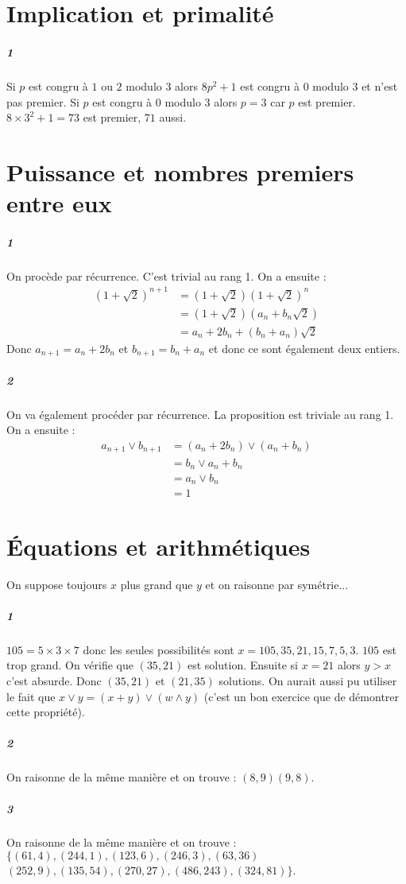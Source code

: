 \documentclass[10pt,a4paper]{article}
\begin{document}
\section{Implication et primalité}
\subparagraph{1}Si $p$ est congru à $1$ ou $2$ modulo 3 alors $8p^2+1$ est congru à $0$ modulo 3 et n'est pas premier. Si $p$ est congru à $0$ modulo 3 alors $p=3$ car $p$ est premier. $8 \times 3^2+1=73$ est premier, $71$ aussi.
\section{Puissance et nombres premiers entre eux}
\subparagraph{1}On procède par récurrence. C'est trivial au rang 1. On a ensuite :
\begin{equation}
\begin{aligned}
(1+ \sqrt{2})^{n+1}&=(1+  \sqrt{2})(1+ \sqrt{2})^n \\
&=(1+ \sqrt{2})(a_n+b_n \sqrt{2}) \\
&=a_n+2 b_n+(b_n+a_n) \sqrt{2}
\end{aligned}
\end{equation}
Donc $a_{n+1}=a_n+2b_n$ et $b_{n+1}=b_n+a_n$ et donc ce sont également deux entiers.
\subparagraph{2} On va également procéder par récurrence. La proposition est triviale au rang 1. On a ensuite :
\begin{equation}
\begin{aligned}
a_{n+1} \vee b_{n+1}&=(a_n +2 b_n) \vee (a_n +b_n)\\
&=b_n \vee a_n+b_n \\
&=a_n \vee b_n \\
&=1
\end{aligned}
\end{equation}
\section{Équations et arithmétiques}
\danger On suppose toujours $x$ plus grand que $y$ et on raisonne par symétrie...
\subparagraph{1} $105 =5 \times 3 \times 7$ donc les seules possibilités sont $x=105, 35, 21, 15, 7,5, 3$. $105$ est trop grand. On vérifie que $(35,21)$ est solution. Ensuite si $x=21$ alors $y >x$ c'est absurde. Donc $(35,21)$ et $(21,35)$ solutions. On aurait aussi pu utiliser le fait que $x \vee y = (x+y) \vee (w \wedge y)$ (c'est un bon exercice que de démontrer cette propriété).
\subparagraph{2}On raisonne de la même manière et on trouve : $(8,9) (9,8)$.
\subparagraph{3}On raisonne de la même manière et on trouve :$\lbrace (61,4),(244,1),(123,6),(246,3),(63,36)$\\$(252,9),(135,54),(270,27),(486,243),(324,81)\rbrace $.
\end{document}
